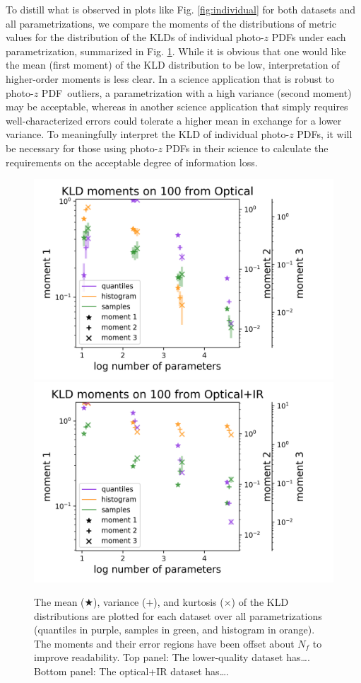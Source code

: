 \documentclass[\docopts]{\docclass}
\newcommand{\pz}{photo-$z$ PDF}
\begin{document}
To distill what is observed in plots like Fig. \ref{fig:individual} for both
datasets and all parametrizations, we compare the moments of the distributions
of metric values for the distribution of the KLDs of individual \pz s under
each parametrization, summarized in Fig. \ref{fig:moments}.  While it is
obvious that one would like the mean (first moment) of the KLD distribution to
be low, interpretation of higher-order moments is less clear.  In a science
application that is robust to \pz\ outliers, a parametrization with a high
variance (second moment) may be acceptable, whereas in another science
application that simply requires well-characterized errors could tolerate a
higher mean in exchange for a lower variance.  To meaningfully interpret the
KLD of individual \pz s, it will be necessary for those using \pz s in their
science to calculate the requirements on the acceptable degree of information
loss.

\begin{figure}
  \includegraphics[width=0.9\columnwidth]{lsst_moments.png}\\
  \includegraphics[width=0.9\columnwidth]{euclid_moments.png}
  \caption{The mean ($\bigstar$), variance ($+$), and kurtosis ($\times$) of
the KLD distributions are plotted for each dataset over all parametrizations
(quantiles in purple, samples in green, and histogram in orange).  The moments
and their error regions have been offset about $N_{f}$ to improve readability.
Top panel: The lower-quality dataset has\dots.  Bottom panel: The optical+IR
dataset has\dots.
  \label{fig:moments}}
\end{figure}
\end{document}
